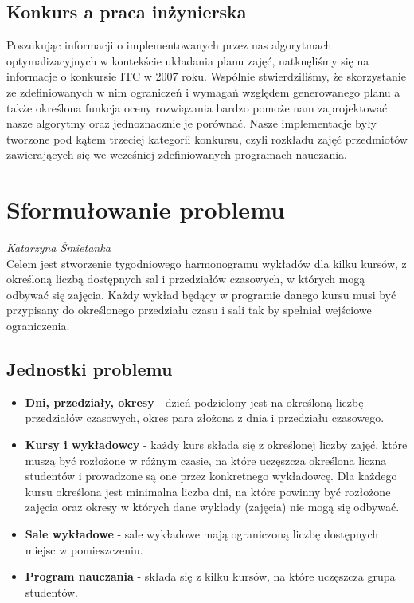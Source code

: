 \subsection{Konkurs a praca inżynierska}
\par Poszukując informacji o implementowanych przez nas algorytmach optymalizacyjnych w kontekście układania planu zajęć, natknęliśmy się na informacje o konkursie ITC w 2007 roku. Wspólnie stwierdziliśmy, że skorzystanie ze zdefiniowanych w nim ograniczeń i wymagań względem generowanego planu a także określona funkcja oceny rozwiązania bardzo pomoże nam zaprojektować nasze algorytmy oraz jednoznacznie je porównać. Nasze implementacje były tworzone pod kątem trzeciej kategorii konkursu, czyli rozkładu zajęć przedmiotów zawierających się we wcześniej zdefiniowanych programach nauczania.
\section{Sformułowanie problemu}
\textit{Katarzyna Śmietanka} \\
Celem jest stworzenie tygodniowego harmonogramu wykładów dla kilku kursów, z określoną liczbą dostępnych sal i przedziałów czasowych, w których mogą odbywać się zajęcia. Każdy wykład będący w programie danego kursu musi być przypisany do określonego przedziału czasu i sali tak by spełniał wejściowe ograniczenia. 
\subsection{Jednostki problemu}
\begin{itemize}
\item{\textbf{Dni, przedziały, okresy} - dzień podzielony jest na określoną liczbę przedziałów czasowych, okres para złożona z dnia i przedziału czasowego.}
\item{\textbf{Kursy i wykładowcy} - każdy kurs składa się z określonej liczby zajęć, które muszą być rozłożone w różnym czasie, na które uczęszcza określona liczna studentów i prowadzone są one przez konkretnego wykładowcę. Dla każdego kursu określona jest minimalna liczba dni, na które powinny być rozłożone zajęcia oraz okresy w których dane wykłady (zajęcia) nie mogą się odbywać.}
\item{\textbf{Sale wykładowe} - sale wykładowe mają ograniczoną liczbę dostępnych miejsc w pomieszczeniu.}
\item{\textbf{Program nauczania} - składa się z kilku kursów, na które uczęszcza grupa studentów.}
\end{itemize}
